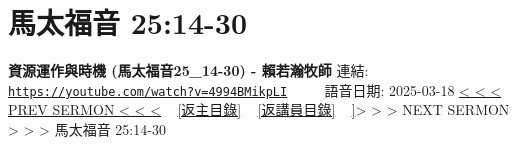 \documentclass{book}
\begin{document}
\section{馬太福音 25:14-30}
\label{sec:4994BMikpLI}
\textbf{資源運作與時機 (馬太福音25\_14-30) - 賴若瀚牧師}
\newline
\newline
連結: \href{https://youtube.com/watch?v=4994BMikpLI}{\texttt{https://youtube.com/watch?v=4994BMikpLI}} ~~~~ 語音日期: 2025-03-18
\newline
\newline
\hyperref[sec:srCkvhUNl9w]{< < < PREV SERMON < < <}
~
\hyperlink{toc}{[返主目錄]}
~
\hyperref[ch:preacher14]{[返講員目錄]}
~
\hyperref[sec:fRyhfftiI8]]{> > > NEXT SERMON > > >}
\newline
\newline
馬太福音 25:14-30
\newline
\end{document}
